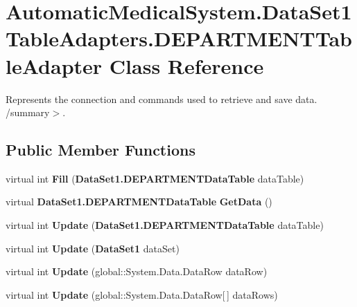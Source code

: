 \section{AutomaticMedicalSystem.DataSet1TableAdapters.DEPARTMENTTableAdapter Class Reference}
\label{class_automatic_medical_system_1_1_data_set1_table_adapters_1_1_d_e_p_a_r_t_m_e_n_t_table_adapter}
Represents the connection and commands used to retrieve and save data. /summary$>$.  


\subsection*{Public Member Functions}
\begin{CompactItemize}
\item 
virtual int \textbf{Fill} ({\bf DataSet1.DEPARTMENTDataTable} dataTable)\label{class_automatic_medical_system_1_1_data_set1_table_adapters_1_1_d_e_p_a_r_t_m_e_n_t_table_adapter_30bc3ef67663cf65c95175b3542a6761}

\item 
virtual {\bf DataSet1.DEPARTMENTDataTable} \textbf{GetData} ()\label{class_automatic_medical_system_1_1_data_set1_table_adapters_1_1_d_e_p_a_r_t_m_e_n_t_table_adapter_c64b743483392fb3cd4f0574dc0ab791}

\item 
virtual int \textbf{Update} ({\bf DataSet1.DEPARTMENTDataTable} dataTable)\label{class_automatic_medical_system_1_1_data_set1_table_adapters_1_1_d_e_p_a_r_t_m_e_n_t_table_adapter_b5acf7132672a61cfe745eb1f110e705}

\item 
virtual int \textbf{Update} ({\bf DataSet1} dataSet)\label{class_automatic_medical_system_1_1_data_set1_table_adapters_1_1_d_e_p_a_r_t_m_e_n_t_table_adapter_bd5abab3ca7327e21d32e0e95fde62ed}

\item 
virtual int \textbf{Update} (global::System.Data.DataRow dataRow)\label{class_automatic_medical_system_1_1_data_set1_table_adapters_1_1_d_e_p_a_r_t_m_e_n_t_table_adapter_4b7e733ce483a90d7966acd78a5651bb}

\item 
virtual int \textbf{Update} (global::System.Data.DataRow[$\,$] dataRows)\label{class_automatic_medical_system_1_1_data_set1_table_adapters_1_1_d_e_p_a_r_t_m_e_n_t_table_adapter_c42fc6f0b33fe0956d28fa5391cce2bf}


\end{CompactItemize}
